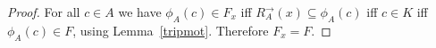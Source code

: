 \documentclass[10pt,a4paper]{amsart}
\newcommand{\dirim}{^{\rightarrow\!}}
\begin{document}
\begin{proof}
For all $c \in A$ we have 
$\phi _A (c) \in F_x$ iff   
$R_A \dirim (x)  \subseteq \phi_A (c)$
iff 
$c \in K$ 
iff 
 $\phi _A (c) \in F$,                             
using Lemma~\ref{tripmot}. Therefore $F_x  = F$.
\end{proof}
\end{document}
